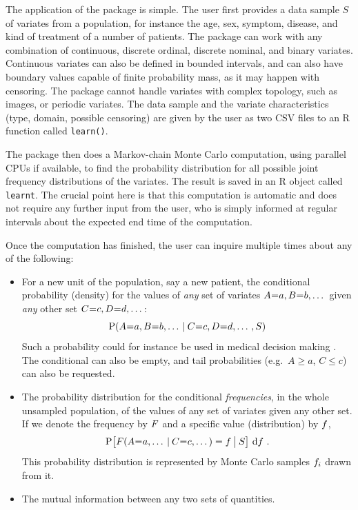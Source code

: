 The application of the package is simple. The user first provides a data sample $S$ of variates from a population, for instance the age, sex, symptom, disease, and kind of treatment of a number of patients. The package can work with any combination of continuous, discrete ordinal, discrete nominal, and binary variates. Continuous variates can also be defined in bounded intervals, and can also have boundary values capable of finite probability mass, as it may happen with censoring. The package cannot handle variates with complex topology, such as images, or periodic variates. The data sample and the variate characteristics (type, domain, possible censoring) are given by the user as two CSV files to an R function called \texttt{learn()}.

The package then does a Markov-chain Monte Carlo computation, using parallel CPUs if available, to find the probability distribution for all possible joint frequency distributions of the variates. The result is saved in an R object called \texttt{learnt}. The crucial point here is that this computation is automatic and does not require any further input from the user, who is simply informed at regular intervals about the expected end time of the computation.

Once the computation has finished, the user can inquire multiple times about any of the following:
\begin{itemize}
\item For a new unit of the population, say a new patient, the conditional probability (density) for the values of \emph{any} set of variates $A \mo a, B \mo b, \dotso$ given \emph{any} other set $C \mo c, D \mo d, \dotso$:
  \begin{equation}\label{eq:prob_var}
    \P(A \mo a, B \mo b, \dotso \|C \mo c, D \mo d, \dotso , S)
  \end{equation}
  Such a probability could for instance be used in medical decision making \citep{soxetal1988_r2024,huninketal2001_r2014}. The conditional can also be empty, and tail probabilities (e.g.\ $A \ge a$, $C \le c$) can also be requested.

\item The probability distribution for the conditional \emph{frequencies}, in the whole unsampled population, of the values of any set of variates given any other set. If we denote the frequency by $F$ and a specific value (distribution) by $f$,
  \begin{equation}\label{eq:prob_freq}
    \P\bigl[ \yF(A \mo a, \dotso \|C \mo c, \dotso) = \yf \|[\big] S\bigr]
    \,\di\yf \ .
  \end{equation}
This probability distribution is represented by Monte Carlo samples $f_{i}$ drawn from it.

\item The mutual information \citep[Ch.~8]{mackay1995_r2005} between any two sets of quantities.
\end{itemize}

